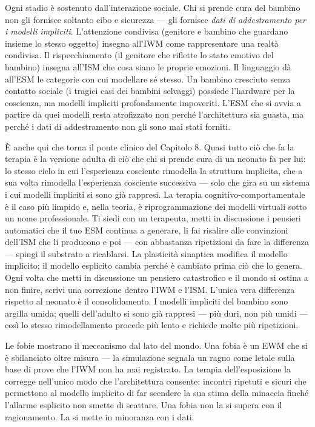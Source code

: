 \documentclass[11pt, twoside, openright]{book}
\begin{document}
Ogni stadio è sostenuto dall'interazione sociale. Chi si prende cura del bambino non gli fornisce soltanto cibo e sicurezza --- gli fornisce \textit{dati di addestramento per i modelli impliciti}. L'attenzione condivisa (genitore e bambino che guardano insieme lo stesso oggetto) insegna all'IWM come rappresentare una realtà condivisa. Il rispecchiamento (il genitore che riflette lo stato emotivo del bambino) insegna all'ISM che cosa siano le proprie emozioni. Il linguaggio dà all'ESM le categorie con cui modellare sé stesso. Un bambino cresciuto senza contatto sociale (i tragici casi dei bambini selvaggi) possiede l'hardware per la coscienza, ma modelli impliciti profondamente impoveriti. L'ESM che si avvia a partire da quei modelli resta atrofizzato non perché l'architettura sia guasta, ma perché i dati di addestramento non gli sono mai stati forniti.

È anche qui che torna il ponte clinico del Capitolo 8. Quasi tutto ciò che fa la terapia è la versione adulta di ciò che chi si prende cura di un neonato fa per lui: lo stesso ciclo in cui l'esperienza cosciente rimodella la struttura implicita, che a sua volta rimodella l'esperienza cosciente successiva --- solo che gira su un sistema i cui modelli impliciti si sono già rappresi. La terapia cognitivo-comportamentale è il caso più limpido e, nella teoria, è riprogrammazione dei modelli virtuali sotto un nome professionale. Ti siedi con un terapeuta, metti in discussione i pensieri automatici che il tuo ESM continua a generare, li fai risalire alle convinzioni dell'ISM che li producono e poi --- con abbastanza ripetizioni da fare la differenza --- spingi il substrato a ricablarsi. La plasticità sinaptica modifica il modello implicito; il modello esplicito cambia perché è cambiato prima ciò che lo genera. Ogni volta che metti in discussione un pensiero catastrofico e il mondo si ostina a non finire, scrivi una correzione dentro l'IWM e l'ISM. L'unica vera differenza rispetto al neonato è il consolidamento. I modelli impliciti del bambino sono argilla umida; quelli dell'adulto si sono già rappresi --- più duri, non più umidi --- così lo stesso rimodellamento procede più lento e richiede molte più ripetizioni.

Le fobie mostrano il meccanismo dal lato del mondo. Una fobia è un EWM che si è sbilanciato oltre misura --- la simulazione segnala un ragno come letale sulla base di prove che l'IWM non ha mai registrato. La terapia dell'esposizione la corregge nell'unico modo che l'architettura consente: incontri ripetuti e sicuri che permettono al modello implicito di far scendere la sua stima della minaccia finché l'allarme esplicito non smette di scattare. Una fobia non la si supera con il ragionamento. La si mette in minoranza con i dati.
\end{document}

